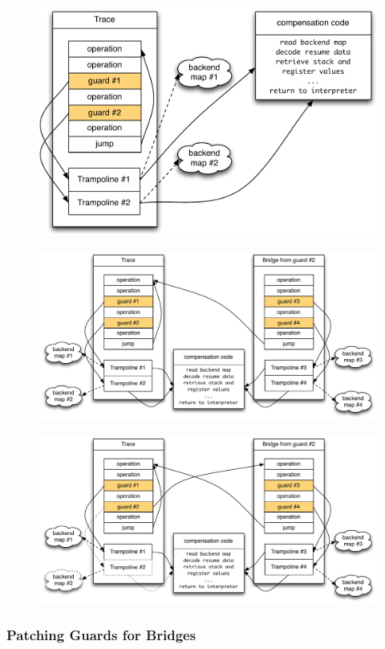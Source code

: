 \documentclass[utf8x]{beamer}
\begin{document}
\begin{frame}
  \begin{figure}
  \centering
  \includegraphics[width=1\textwidth]{figures/loop.pdf}
  \label{fig:trampoline}
  \end{figure}
\end{frame}

\begin{frame}
  \begin{figure}
  \centering
  \includegraphics[width=1\textwidth]{figures/bridge_compiled.pdf}
  \label{fig:trampoline}
  \end{figure}
\end{frame}
\begin{frame}
  \begin{figure}
  \centering
  \includegraphics[width=1\textwidth]{figures/bridge_patched.pdf}
  \label{fig:trampoline}
  \end{figure}
\end{frame}

\begin{frame}
  \frametitle{Patching Guards for Bridges}
\end{frame}


\end{document}
